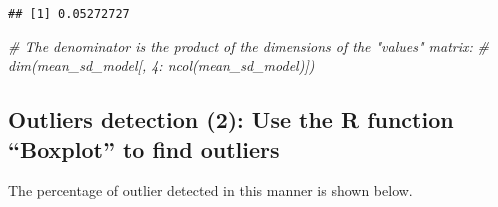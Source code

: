 \documentclass[]{article}
\newenvironment{Shaded}{\begin{snugshade}}{\end{snugshade}}
\newcommand{\CommentTok}[1]{\textcolor[rgb]{0.56,0.35,0.01}{\textit{#1}}}
\begin{document}
\begin{verbatim}
## [1] 0.05272727
\end{verbatim}

\begin{Shaded}
\begin{Highlighting}[]
\CommentTok{# The denominator is the product of the dimensions of the "values" matrix: }
\CommentTok{# dim(mean_sd_model[, 4: ncol(mean_sd_model)])}
\end{Highlighting}
\end{Shaded}

\hypertarget{outliers-detection-2-use-the-r-function-boxplot-to-find-outliers}{%
\subsection{Outliers detection (2): Use the R function ``Boxplot'' to
find
outliers}\label{outliers-detection-2-use-the-r-function-boxplot-to-find-outliers}}

The percentage of outlier detected in this manner is shown below.
\end{document}
